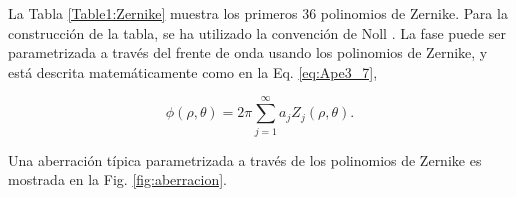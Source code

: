 La Tabla \ref{Table1:Zernike}  muestra los primeros 36 polinomios de Zernike. Para la construcción de la tabla, se ha utilizado la convención de Noll . La fase puede ser parametrizada a través del frente de onda usando los polinomios de Zernike, y está descrita matemáticamente como en la Eq. \ref{eq:Ape3_7},

\begin{equation}\label{eq:Ape3_7}
\phi(\rho, \theta)= 2\pi \sum_{j=1}^\infty a_{j}Z_{j}(\rho,\theta). 
\end{equation}

Una aberración típica parametrizada a través de los polinomios de Zernike es mostrada en la Fig. \ref{fig:aberracion}.

\begin{table}[htbp]
\end{table}
